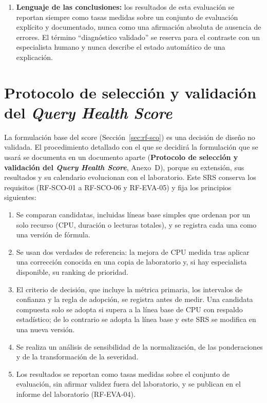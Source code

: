 \documentclass[11pt,a4paper]{report}
\begin{document}
\begin{enumerate}
\item \textbf{Lenguaje de las conclusiones:} los resultados de esta evaluaci\'on se reportan siempre como tasas medidas sobre un conjunto de evaluaci\'on expl\'icito y documentado, nunca como una afirmaci\'on absoluta de ausencia de errores. El t\'ermino \textquotedblleft diagn\'ostico validado\textquotedblright{} se reserva para el contraste con un especialista humano y nunca describe el estado autom\'atico de una explicaci\'on.
\end{enumerate}

\section{Protocolo de selecci\'on y validaci\'on del \textit{Query Health Score}}
\label{sec:protocolo-score}

La formulaci\'on base del score (Secci\'on~\ref{sec:rf-sco}) es una decisi\'on de dise\~no no validada. El procedimiento detallado con el que se decidir\'a la formulaci\'on que se usar\'a se documenta en un documento aparte (\textbf{Protocolo de selecci\'on y validaci\'on del \textit{Query Health Score}}, Anexo~D), porque su extensi\'on, sus resultados y su calendario evolucionan con el laboratorio. Este SRS conserva los requisitos (RF-SCO-01 a RF-SCO-06 y RF-EVA-05) y fija los principios siguientes:

\begin{enumerate}
\item Se comparan candidatas, incluidas l\'ineas base simples que ordenan por un solo recurso (CPU, duraci\'on o lecturas totales), y se registra cada una como una versi\'on de f\'ormula.
\item Se usan dos verdades de referencia: la mejora de CPU medida tras aplicar una correcci\'on conocida en una copia de laboratorio y, si hay especialista disponible, su ranking de prioridad.
\item El criterio de decisi\'on, que incluye la m\'etrica primaria, los intervalos de confianza y la regla de adopci\'on, se registra antes de medir. Una candidata compuesta solo se adopta si supera a la l\'inea base de CPU con respaldo estad\'istico; de lo contrario se adopta la l\'inea base y este SRS se modifica en una nueva versi\'on.
\item Se realiza un an\'alisis de sensibilidad de la normalizaci\'on, de las ponderaciones y de la transformaci\'on de la severidad.
\item Los resultados se reportan como tasas medidas sobre el conjunto de evaluaci\'on, sin afirmar validez fuera del laboratorio, y se publican en el informe del laboratorio (RF-EVA-04).
\end{enumerate}
\end{document}
